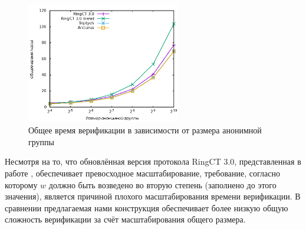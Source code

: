 \documentclass{article}
\theoremstyle{definition}
\begin{document}
\begin{figure}
\centering
\includegraphics[width=0.6\textwidth]{time.png}
\caption{Общее время верификации в зависимости от размера анонимной группы}
\label{fig:time}
\end{figure}

Несмотря на то, что обновлённая версия протокола RingCT 3.0, представленная в работе \cite{rct3}, обеспечивает превосходное масштабирование, требование, согласно которому $w$ должно быть возведено во вторую степень (заполнено до этого значения), является причиной плохого масштабирования времени верификации.
В сравнении предлагаемая нами конструкция обеспечивает более низкую общую сложность верификации за счёт масштабирования общего размера.




\end{document}

